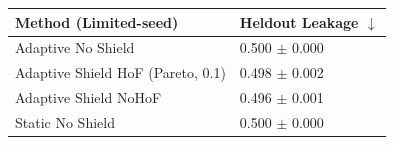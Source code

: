 \begin{tabular}{ll}
\toprule
Method (Limited-seed) & Heldout Leakage $\downarrow$ \\
\midrule
Adaptive No Shield & 0.500 $\pm$ 0.000 \\
Adaptive Shield HoF (Pareto, 0.1) & 0.498 $\pm$ 0.002 \\
Adaptive Shield NoHoF & 0.496 $\pm$ 0.001 \\
Static No Shield & 0.500 $\pm$ 0.000 \\
\bottomrule
\end{tabular}
